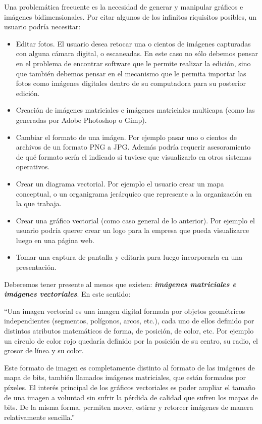 \documentclass[12pt]{article}
\begin{document}
Una problemática frecuente es la necesidad de generar y manipular gráficos e imágenes 
bidimensionales. Por citar algunos de los infinitos riquisitos posibles, un usuario 
podría necesitar: 
\begin{itemize}
	\item Editar fotos. El usuario desea retocar una o cientos de imágenes capturadas
	      con alguna cámara digital, o escaneadas. En este caso no sólo debemos pensar en el problema de 
	      encontrar software que le permite realizar la edición, sino que también debemos
	      pensar en el mecanismo que le permita importar las fotos como imágenes digitales
	      dentro de su computadora para su posterior edición.    
	\item Creación de imágenes matriciales e imágenes matriciales multicapa (como las generadas por 
	Adobe Photoshop o Gimp).  
	\item Cambiar el formato de una imágen. Por ejemplo pasar uno o cientos de archivos de 
	un formato PNG a JPG. Además podría requerir asesoramiento de qué formato sería el 
	indicado si tuviese que visualizarlo en otros sistemas operativos. 
	\item Crear un diagrama vectorial. Por ejemplo el usuario crear un mapa conceptual, o
	un organigrama jerárquico que represente a la organización en la que trabaja.    
	\item Crear una gráfico vectorial (como caso general de lo anterior). Por ejemplo el 
	usuario podría querer crear un logo para la empresa que pueda visualizarce luego en 
	una página web.  
	\item Tomar una captura de pantalla y editarla para luego incorporarla en una presentación. 
\end{itemize}

Deberemos tener presente al menos que existen: {\bf{\it imágenes matriciales e imágenes vectoriales}}. 
En este sentido:  

``Una imagen vectorial es una imagen digital formada por objetos geométricos independientes (segmentos, 
polígonos, arcos, etc.), cada uno de ellos definido por distintos atributos matemáticos de forma, de 
posición, de color, etc. Por ejemplo un círculo de color rojo quedaría definido por la posición 
de su centro, su radio, el grosor de línea y su color.

Este formato de imagen es completamente distinto al formato de las imágenes de mapa de bits, también 
llamados imágenes matriciales, que están formados por píxeles. El interés principal de los gráficos 
vectoriales es poder ampliar el tamaño de una imagen a voluntad sin sufrir la pérdida 
de calidad que sufren los mapas de bits. De la misma forma, permiten mover, estirar y 
retorcer imágenes de manera relativamente sencilla.'' \cite{wikiives}
\end{document}
